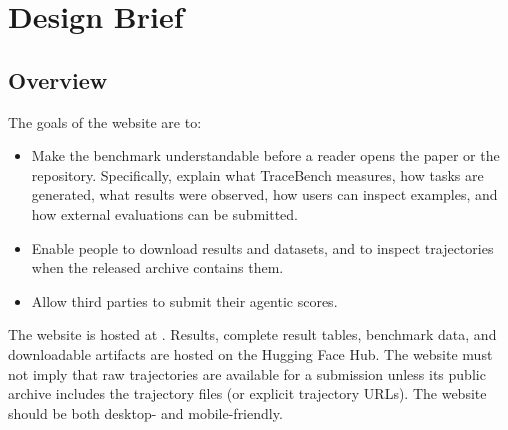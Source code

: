\documentclass[11pt]{article}
\begin{document}
\label{sec:website-design-brief}
\section*{Design Brief}
\label{sec:website-overview}
\subsection*{Overview}
The goals of the website are to:
\begin{itemize}
    \item Make the benchmark understandable before a reader opens the paper or the repository.
    Specifically, explain what TraceBench measures, how tasks are generated, what results were observed, how users can inspect examples, and how external evaluations can be submitted.
    \item Enable people to download results and datasets, and to inspect trajectories when the released archive contains them.
    \item Allow third parties to submit their agentic scores.
\end{itemize}
The website is hosted at .
Results, complete result tables, benchmark data, and downloadable artifacts are hosted on the Hugging Face Hub. The website must not imply that raw trajectories are available for a submission unless its public archive includes the trajectory files (or explicit trajectory URLs).
The website should be both desktop- and mobile-friendly.



\label{sec:website-user-admin-actions}
\end{document}
